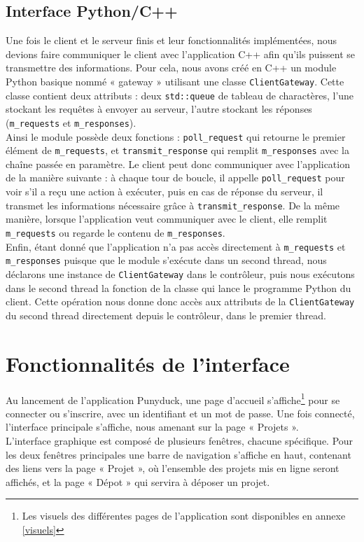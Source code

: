 \documentclass[twoside]{report}
\begin{document}
\subsection{Interface Python/C++}
Une fois le client et le serveur finis et leur fonctionnalités implémentées, nous devions faire communiquer le client avec l'application C++ afin qu'ils puissent se transmettre des informations. Pour cela, nous avons créé en C++ un module Python basique nommé « gateway » utilisant une classe \verb!ClientGateway!. Cette classe contient deux attributs : deux \verb!std::queue! de tableau de charactères, l'une stockant les requêtes à envoyer au serveur, l'autre stockant les réponses (\verb!m_requests! et \verb!m_responses!).\\
Ainsi le module possède deux fonctions : \verb!poll_request! qui retourne le premier élément de \verb!m_requests!, et \verb!transmit_response! qui remplit \verb!m_responses! avec la chaîne passée en paramètre. Le client peut donc communiquer avec l'application de la manière suivante : à chaque tour de boucle, il appelle \verb!poll_request! pour voir s'il a reçu une action à exécuter, puis en cas de réponse du serveur, il transmet les informations nécessaire grâce à \verb!transmit_response!. De la même manière, lorsque l'application veut communiquer avec le client, elle remplit \verb!m_requests! ou regarde le contenu de \verb!m_responses!.\\
Enfin, étant donné que l'application n'a pas accès directement à \verb!m_requests! et \verb!m_responses! puisque que le module s'exécute dans un second thread, nous déclarons une instance de \verb!ClientGateway! dans le contrôleur, puis nous exécutons dans le second thread la fonction de la classe qui lance le programme Python du client. Cette opération nous donne donc accès aux attributs de la \verb!ClientGateway! du second thread directement depuis le contrôleur, dans le premier thread.

\section{Fonctionnalités de l'interface}
Au lancement de l'application Punyduck, une page d'accueil s'affiche\footnote{\label{note2}Les visuels des différentes pages de l'application sont disponibles en annexe \ref{visuels}} pour se connecter ou s'inscrire, avec un identifiant et un mot de passe. Une fois connecté, l’interface principale s'affiche, nous amenant sur la page « Projets ». \\
L'interface graphique est composé de plusieurs fenêtres, chacune spécifique. Pour les deux fenêtres principales une barre de navigation s'affiche en haut, contenant des liens vers la page « Projet », où l'ensemble des projets mis en ligne seront affichés, et la page « Dépot » qui servira à déposer un projet. \\
\end{document}
